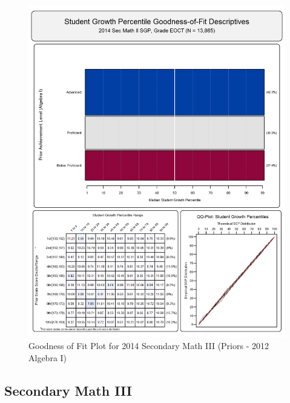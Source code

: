 \documentclass[12pt]{article}
\begin{document}
\begin{figure}[htbp]
\centering
\includegraphics{../img/Goodness_of_Fit/SEC_MATH_II.2014/2014_SEC_MATH_II_EOCT;2012_ALGEBRA_I_EOCT.png}
\caption{Goodness of Fit Plot for 2014 Secondary Math III (Priors - 2012
Algebra I)}
\end{figure}

\clearpage 

\subsection{Secondary Math III}\label{secondary-math-iii}
\end{document}
